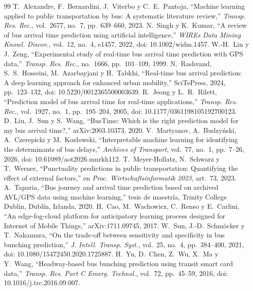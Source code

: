\documentclass[conference]{IEEEtran}
\begin{document}
\begin{thebibliography}{99}
 T.~Alexandre, F.~Bernardini, J.~Viterbo y C.~E.~Pantoja, ``Machine learning applied to public transportation by bus: A systematic literature review,'' \emph{Transp. Res. Rec.}, vol.~2677, no.~7, pp.~639--660, 2023.
 N.~Singh y K.~Kumar, ``A review of bus arrival time prediction using artificial intelligence,'' \emph{WIREs Data Mining Knowl. Discov.}, vol.~12, no.~4, e1457, 2022, doi: 10.1002/widm.1457.
 W.-H.~Lin y J.~Zeng, ``Experimental study of real-time bus arrival time prediction with GPS data,'' \emph{Transp. Res. Rec.}, no.~1666, pp.~101--109, 1999.
 N.~Rashvand, S.~S.~Hosseini, M.~Azarbayjani y H.~Tabkhi, ``Real-time bus arrival prediction: A deep learning approach for enhanced urban mobility,'' SciTePress, 2024, pp.~123--132, doi: 10.5220/0012365500003639.
 R.~Jeong y L.~R.~Rilett, ``Prediction model of bus arrival time for real-time applications,'' \emph{Transp. Res. Rec.}, vol.~1927, no.~1, pp.~195--204, 2005, doi: 10.1177/0361198105192700123.
 D.~Liu, J.~Sun y S.~Wang, ``BusTime: Which is the right prediction model for my bus arrival time?,'' arXiv:2003.10373, 2020.
 V.~Martyanov, A.~Budzyński, A.~Czerepicki y M.~Kozłowski, ``Interpretable machine learning for identifying the determinants of bus delays,'' \emph{Archives of Transport}, vol.~77, no.~1, pp.~7--26, 2026, doi: 10.61089/aot2026.mnrkh112.
 T.~Meyer-Hollatz, N.~Schwarz y T.~Werner, ``Punctuality predictions in public transportation: Quantifying the effect of external factors,'' en \emph{Proc. Wirtschaftsinformatik 2023}, art.~73, 2023.
 A.~Taparia, ``Bus journey and arrival time prediction based on archived AVL/GPS data using machine learning,'' tesis de maestría, Trinity College Dublin, Dublín, Irlanda, 2020.
 H.~Cao, M.~Wachowicz, C.~Renso y E.~Carlini, ``An edge-fog-cloud platform for anticipatory learning process designed for Internet of Mobile Things,'' arXiv:1711.09745, 2017.
 W.~Sun, J.-D.~Schmöcker y T.~Nakamura, ``On the trade-off between sensitivity and specificity in bus bunching prediction,'' \emph{J. Intell. Transp. Syst.}, vol.~25, no.~4, pp.~384--400, 2021, doi: 10.1080/15472450.2020.1725887.
 H.~Yu, D.~Chen, Z.~Wu, X.~Ma y Y.~Wang, ``Headway-based bus bunching prediction using transit smart card data,'' \emph{Transp. Res. Part C Emerg. Technol.}, vol.~72, pp.~45--59, 2016, doi: 10.1016/j.trc.2016.09.007.

\end{thebibliography}
\end{document}
